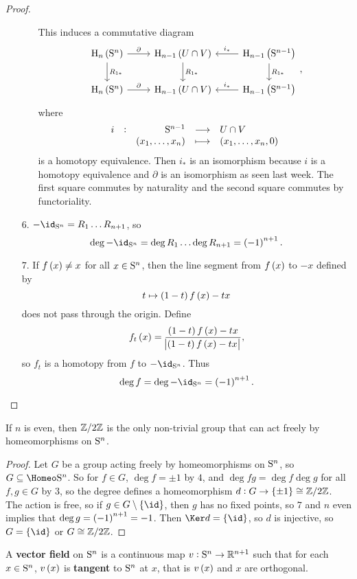 \begin{proof}
\begin{itemize}
\begin{itemize}[leftmargin=2cm]
This induces a commutative diagram
$$
\begin{tikzcd}
\H_n\br{\S^n} \arrow{r}{\partial} \arrow{d}{R_{1*}} & \H_{n - 1}\br{U \cap V} \arrow{d}{R_{1*}} & \H_{n - 1}\br{\S^{n - 1}}\arrow[swap]{l}{i_*} \arrow{d}{R_{1*}} \\
\H_n\br{\S^n} \arrow{r}{\partial} & \H_{n - 1}\br{U \cap V} & \H_{n - 1}\br{\S^{n - 1}}\arrow[swap]{l}{i_*}
\end{tikzcd},
$$
where
$$ \function[i]{\S^{n - 1}}{U \cap V}{\br{x_1, \dots, x_n}}{\br{x_1, \dots, x_n, 0}} $$
is a homotopy equivalence. Then $ i_* $ is an isomorphism because $ i $ is a homotopy equivalence and $ \partial $ is an isomorphism as seen last week. The first square commutes by naturality and the second square commutes by functoriality.
\end{itemize}
\item[$ 6 $.] $ -\id_{\S^n} = R_1 \dots R_{n + 1} $, so
$$ \deg -\id_{\S^n} = \deg R_1 \dots \deg R_{n + 1} = \br{-1}^{n + 1}. $$
\item[$ 7 $.] If $ f\br{x} \ne x $ for all $ x \in \S^n $, then the line segment from $ f\br{x} $ to $ -x $ defined by
$$ t \mapsto \br{1 - t}f\br{x} - tx $$
does not pass through the origin. Define
$$ f_t\br{x} = \dfrac{\br{1 - t}f\br{x} - tx}{\abs{\br{1 - t}f\br{x} - tx}}, $$
so $ f_t $ is a homotopy from $ f $ to $ -\id_{\S^n} $. Thus
$$ \deg f = \deg -\id_{\S^n} = \br{-1}^{n + 1}. $$
\end{itemize}
\end{proof}

\begin{proposition}
If $ n $ is even, then $ \ZZ / 2\ZZ $ is the only non-trivial group that can act freely by homeomorphisms on $ \S^n $.
\end{proposition}

\begin{proof}
Let $ G $ be a group acting freely by homeomorphisms on $ \S^n $, so $ G \subseteq \Homeo \S^n $. So for $ f \in G $, $ \deg f = \pm 1 $ by $ 4 $, and $ \deg fg = \deg f\deg g $ for all $ f, g \in G $ by $ 3 $, so the degree defines a homeomorphism $ d : G \to \cbr{\pm 1} \cong \ZZ / 2\ZZ $. The action is free, so if $ g \in G \setminus \cbr{\id} $, then $ g $ has no fixed points, so $ 7 $ and $ n $ even implies that $ \deg g = \br{-1}^{n + 1} = -1 $. Then $ \Ker d = \cbr{\id} $, so $ d $ is injective, so $ G = \cbr{\id} $ or $ G \cong \ZZ / 2\ZZ $.
\end{proof}

\begin{definition*}
A \textbf{vector field} on $ \S^n $ is a continuous map $ v : \S^n \to \RR^{n + 1} $ such that for each $ x \in \S^n $, $ v\br{x} $ is \textbf{tangent} to $ \S^n $ at $ x $, that is $ v\br{x} $ and $ x $ are orthogonal.
\end{definition*}

